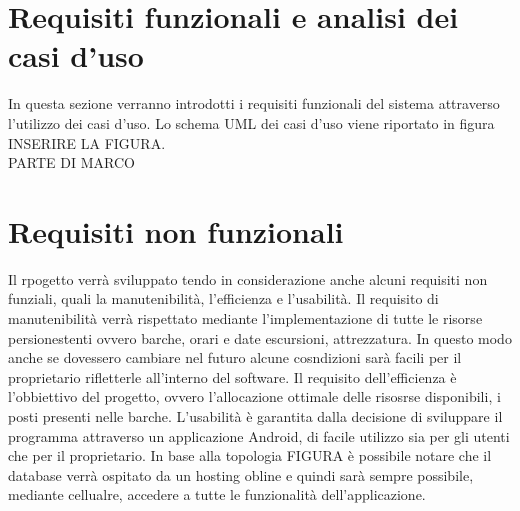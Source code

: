 \section{Requisiti funzionali e analisi dei casi d'uso}
In questa sezione verranno introdotti i requisiti funzionali del sistema attraverso l'utilizzo dei casi d'uso. Lo schema UML dei casi d'uso viene riportato in figura INSERIRE LA FIGURA. 
\\
PARTE DI MARCO 
\\

\section{Requisiti non funzionali}
Il rpogetto verrà sviluppato tendo in considerazione anche alcuni requisiti non funziali, quali la manutenibilità, l'efficienza e l'usabilità. 
Il requisito di manutenibilità verrà rispettato mediante l'implementazione di tutte le risorse persionestenti ovvero barche, orari e date escursioni, attrezzatura. In questo modo anche se dovessero cambiare nel futuro alcune cosndizioni sarà facili per il proprietario rifletterle all'interno del software.
Il requisito dell'efficienza è l'obbiettivo del progetto, ovvero l'allocazione ottimale delle risosrse disponibili, i posti presenti nelle barche. 
L'usabilità è garantita dalla decisione di sviluppare il programma attraverso un applicazione Android, di facile utilizzo sia per gli utenti che per il proprietario. In base alla topologia FIGURA è possibile notare che il database verrà ospitato da un hosting obline e quindi sarà sempre possibile, mediante cellualre, accedere a tutte le funzionalità dell'applicazione. 